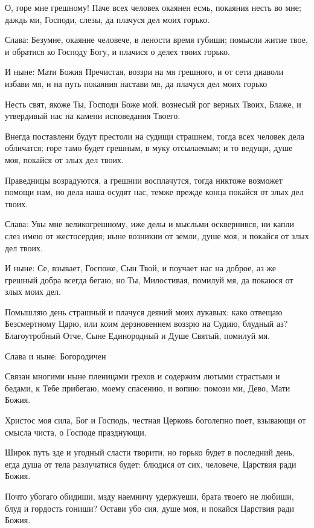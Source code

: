 О, горе мне грешному! Паче всех человек окаянен есмь, покаяния несть во мне; даждь ми, Господи, слезы, да плачуся дел моих горько.


Слава: Безумне, окаянне человече, в лености время губиши; помысли житие твое, и обратися ко Господу Богу, и плачися о делех твоих горько.


И ныне: Мати Божия Пречистая, воззри на мя грешного, и от сети диаволи избави мя, и на путь покаяния настави мя, да плачуся дел моих горько




Несть свят, якоже Ты, Господи Боже мой, вознесый рог верных Твоих, Блаже, и утвердивый нас на камени исповедания Твоего.


Внегда поставлени будут престоли на судищи страшнем, тогда всех человек дела обличатся; горе тамо будет грешным, в муку отсылаемым; и то ведущи, душе моя, покайся от злых дел твоих.

Праведницы возрадуются, а грешнии восплачутся, тогда никтоже возможет помощи нам, но дела наша осудят нас, темже прежде конца покайся от злых дел твоих.


Слава: Увы мне великогрешному, иже делы и мысльми осквернився, ни капли слез имею от жестосердия; ныне возникни от земли, душе моя, и покайся от злых дел твоих.


И ныне: Се, взывает, Госпоже, Сын Твой, и поучает нас на доброе, аз же грешный добра всегда бегаю; но Ты, Милостивая, помилуй мя, да покаюся от злых моих дел.




Помышляю день страшный и плачуся деяний моих лукавых: како отвещаю Безсмертному Царю, или коим дерзновением воззрю на Судию, блудный аз? Благоутробный Отче, Сыне Единородный и Душе Святый, помилуй мя.


Слава и ныне: Богородичен


Связан многими ныне пленицами грехов и содержим лютыми страстьми и бедами, к Тебе прибегаю, моему спасению, и вопию: помози ми, Дево, Мати Божия.




Христос моя сила, Бог и Господь, честная Церковь боголепно поет, взывающи от смысла чиста, о Господе празднующи.


Широк путь зде и угодный сласти творити, но горько будет в последний день, егда душа от тела разлучатися будет: блюдися от сих, человече, Царствия ради Божия.


Почто убогаго обидиши, мзду наемничу удержуеши, брата твоего не любиши, блуд и гордость гониши? Остави убо сия, душе моя, и покайся Царствия ради Божия.


